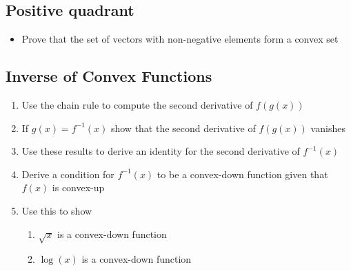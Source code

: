 \documentclass[11pt]{article}
\begin{document}
\subsection{Positive quadrant}
\label{sec:org62223d2}
\begin{itemize}
\item Prove that the set of vectors with non-negative elements form a
convex set
\end{itemize}

\subsection{Inverse of Convex Functions}
\label{sec:org4e7665c}
\begin{enumerate}
\item Use the chain rule to compute the second derivative of \(f(g(x))\)
\item If \(g(x) = f^{-1}(x)\) show that the second derivative of
\(f(g(x))\) vanishes
\item Use these results to derive an identity for the second derivative
of \(f^{-1}(x)\)
\item Derive a condition for \(f^{-1}(x)\) to be a
convex-down function given that \(f(x)\) is convex-up
\item Use this to show
\begin{enumerate}
\item \(\sqrt{x}\) is a convex-down function
\item \(\log(x)\) is a convex-down function
\end{enumerate}
\end{enumerate}
\end{document}
